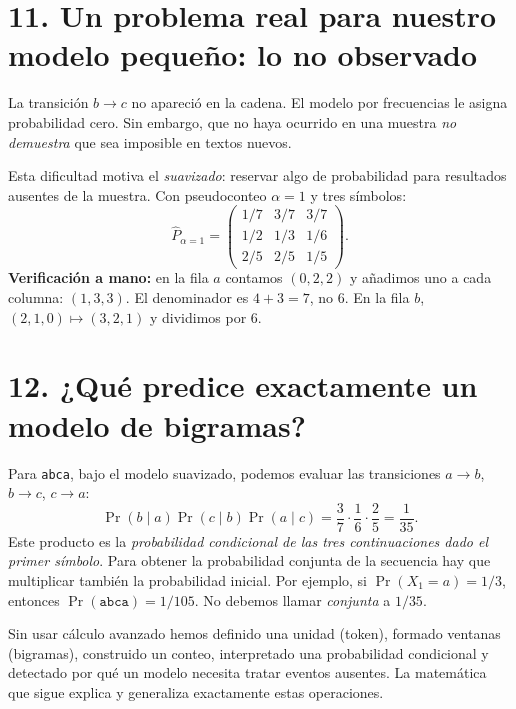 \section*{11. Un problema real para nuestro modelo pequeño: lo no observado}
La transición $b\to c$ no apareció en la cadena. El modelo por frecuencias le asigna probabilidad cero. Sin embargo, que no haya ocurrido en una muestra \emph{no demuestra} que sea imposible en textos nuevos.
\begin{center}
\end{center}
Esta dificultad motiva el \emph{suavizado}: reservar algo de probabilidad para resultados ausentes de la muestra. Con pseudoconteo $\alpha=1$ y tres símbolos:
\[
\widehat P_{\alpha=1}=\begin{pmatrix}1/7&3/7&3/7\\1/2&1/3&1/6\\2/5&2/5&1/5\end{pmatrix}.
\]
\textbf{Verificación a mano:} en la fila $a$ contamos $(0,2,2)$ y añadimos uno a cada columna: $(1,3,3)$. El denominador es $4+3=7$, no $6$. En la fila $b$, $(2,1,0)\mapsto(3,2,1)$ y dividimos por $6$.

\section*{12. ¿Qué predice exactamente un modelo de bigramas?}
Para \texttt{abca}, bajo el modelo suavizado, podemos evaluar las transiciones $a\to b$, $b\to c$, $c\to a$:
\[
\Pr(b\mid a)\Pr(c\mid b)\Pr(a\mid c)=\frac37\cdot\frac16\cdot\frac25=\frac1{35}.
\]
Este producto es la \emph{probabilidad condicional de las tres continuaciones dado el primer símbolo}. Para obtener la probabilidad conjunta de la secuencia hay que multiplicar también la probabilidad inicial. Por ejemplo, si $\Pr(X_1=a)=1/3$, entonces $\Pr(\texttt{abca})=1/105$. No debemos llamar \emph{conjunta} a $1/35$.

\begin{idea}
Sin usar cálculo avanzado hemos definido una unidad (token), formado ventanas (bigramas), construido un conteo, interpretado una probabilidad condicional y detectado por qué un modelo necesita tratar eventos ausentes. La matemática que sigue explica y generaliza exactamente estas operaciones.
\end{idea}
\clearpage
